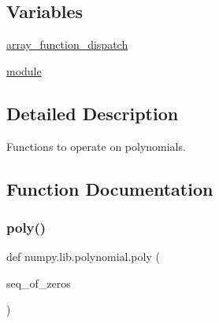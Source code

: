 \subsection*{Variables}
\begin{DoxyCompactItemize}
\item 
\hyperlink{namespacenumpy_1_1lib_1_1polynomial_a81aa094e1e92d3709ccc61cd33748cdb}{array\+\_\+function\+\_\+dispatch}
\item 
\hyperlink{namespacenumpy_1_1lib_1_1polynomial_ac2cf51e66da406b650e81d14e62b8aa4}{module}
\end{DoxyCompactItemize}


\subsection{Detailed Description}
\begin{DoxyVerb}Functions to operate on polynomials.\end{DoxyVerb}
 

\subsection{Function Documentation}
\mbox{\label{namespacenumpy_1_1lib_1_1polynomial_a0b38f3b9ce59db65a5dd7475d8baf5f2}} 
\subsubsection{\texorpdfstring{poly()}{poly()}}
{\footnotesize\ttfamily def numpy.\+lib.\+polynomial.\+poly (\begin{DoxyParamCaption}\item[{}]{seq\+\_\+of\+\_\+zeros }\end{DoxyParamCaption})}

